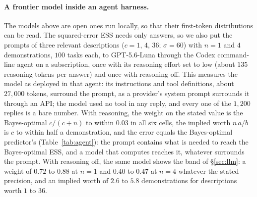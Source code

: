 \documentclass{article}
\begin{document}
\paragraph{A frontier model inside an agent harness.} The models above are open ones run locally, so that their first-token distributions can be read. The squared-error ESS needs only answers, so we also put the prompts of three relevant descriptions ($c = 1$, $4$, $36$; $\sigma = 60$) with $n = 1$ and $4$ demonstrations, $100$ tasks each, to GPT-5.6-Luna through the Codex command-line agent on a subscription, once with its reasoning effort set to low (about $135$ reasoning tokens per answer) and once with reasoning off. This measures the model as deployed in that agent: its instructions and tool definitions, about $27{,}000$ tokens, surround the prompt, as a provider's system prompt surrounds it through an API; the model used no tool in any reply, and every one of the $1{,}200$ replies is a bare number. With reasoning, the weight on the stated value is the Bayes-optimal $c/(c+n)$ to within $0.03$ in all six cells, the implied worth $n\,a/b$ is $c$ to within half a demonstration, and the error equals the Bayes-optimal predictor's (Table~\ref{tab:agent}): the prompt contains what is needed to reach the Bayes-optimal ESS, and a model that computes reaches it, whatever surrounds the prompt. With reasoning off, the same model shows the band of \S\ref{sec:llm}: a weight of $0.72$ to $0.88$ at $n = 1$ and $0.40$ to $0.47$ at $n = 4$ whatever the stated precision, and an implied worth of $2.6$ to $5.8$ demonstrations for descriptions worth $1$ to $36$.

\begin{table}[h]
\centering\small
\caption{\textbf{A frontier model reaches the Bayes-optimal weight when it reasons and shows the fixed weight of the open models when it does not.} GPT-5.6-Luna inside the Codex agent harness, $100$ tasks per cell, relevant descriptions at $\sigma = 60$; weight on the stated value and implied worth $n\,a/b$ from the regression of \S\ref{sec:llm}; bootstrap standard errors of the weights are at most $0.03$ with reasoning and $0.07$ without.}
\label{tab:agent}

\end{table}

\begin{table}[t]
\centering\scriptsize
\setlength{\tabcolsep}{2.5pt}
\caption{Weight on the stated value, model/Bayes-optimal, for every condition and number of demonstrations shown. Italics as in Table~\ref{tab:llm-worth}.}
\label{tab:llm-full}
\vspace{3pt}

\end{table}
\end{document}

